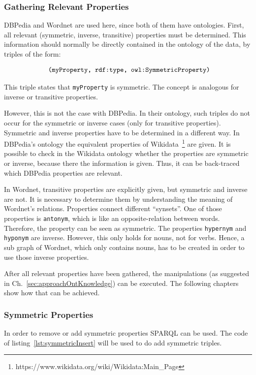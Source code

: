\subsubsection{Gathering Relevant Properties}
DBPedia and Wordnet are used here, since both of them have ontologies. First, all relevant (symmetric, inverse, transitive) properties must be determined. This information should normally be directly contained in the ontology of the data, by triples of the form:

\[
\text{ {\tt (myProperty, rdf:type, owl:SymmetricProperty)}}
\] 

This triple states that {\tt myProperty} is symmetric. The concept is analogous for inverse or transitive properties. 

However, this is not the case with DBPedia. In their ontology, such triples do not occur for the symmetric or inverse cases (only for transitive properties). Symmetric and inverse properties have to be determined in a different way. In DBPedia's ontology the equivalent properties of Wikidata~\footnote{https://www.wikidata.org/wiki/Wikidata:Main\_Page} are given. It is possible to check in the Wikidata ontology whether the properties are symmetric or inverse, because there the information is given. Thus, it can be  back-traced which DBPedia properties are relevant.

In Wordnet, transitive properties are explicitly given, but symmetric and inverse are not. It is necessary to determine them by understanding the meaning of Wordnet's relations. Properties connect different \enquote{synsets}. One of those properties is {\tt antonym}, which is like an opposite-relation between words. Therefore, the property can be seen as symmetric. The properties {\tt hypernym} and {\tt hyponym} are inverse. However, this only holds for nouns, not for verbs. Hence, a sub graph of Wordnet, which only contains nouns, has to be created in order to use those inverse properties.

After all relevant properties have been gathered, the manipulations (as suggested in Ch.~\ref{sec:approachOntKnowledge}) can be executed. The following chapters show how that can be achieved.

\subsubsection{Symmetric Properties}

In order to remove or add symmetric properties SPARQL can be used. The code of listing~\ref{lst:symmetricInsert} will be used to do add symmetric triples.

